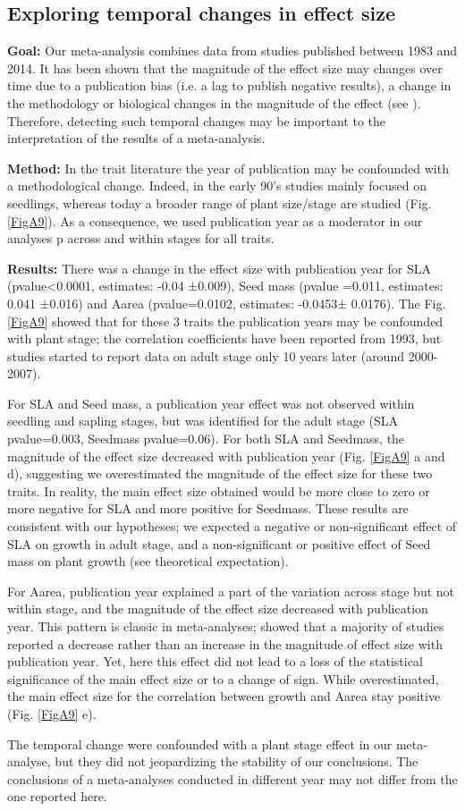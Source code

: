 \documentclass[a4paper]{article}\usepackage[]{graphicx}\usepackage[]{color}
\begin{document}
\begin{appendices}
\subsection{Exploring temporal changes in effect size}
\textbf{Goal:} Our meta-analysis combines data from studies published between 1983 and 2014. It has been shown that the magnitude of the effect size may changes over time due to a publication bias (i.e. a lag to publish negative results), a change in the methodology or biological changes in the magnitude of the effect (see \citealt{Koricheva:2013hy}). Therefore, detecting such temporal changes may be important to the interpretation of the results of a meta-analysis. 

\textbf{Method:} In the trait literature the year of publication may be confounded with a methodological change. Indeed, in the early 90’s studies mainly focused on seedlings, whereas today a broader range of plant size/stage are studied (Fig. \ref{FigA9}). As a consequence, we used publication year as a moderator in our analyses \citep{Zvereva:2008jm}p across and within stages for all traits. 
 
\textbf{Results:} There was a change in the effect size with publication year for SLA (pvalue<0.0001, estimates: -0.04 ±0.009), Seed mass (pvalue =0.011, estimates: 0.041 ±0.016) and Aarea (pvalue=0.0102, estimates: -0.0453± 0.0176). The Fig. \ref{FigA9} showed that for these 3 traits the publication years may be confounded with plant stage; the correlation coefficients have been reported from 1993, but studies started to report data on adult stage only 10 years later (around 2000-2007). 

For SLA and Seed mass, a publication year effect was not observed within seedling and sapling stages, but was identified for the adult stage (SLA pvalue=0.003, Seedmass pvalue=0.06). For both SLA and Seedmass, the magnitude of the effect size decreased with publication year (Fig. \ref{FigA9} a and d), suggesting we overestimated the magnitude of the effect size for these two traits.  In reality, the main effect size obtained would be more close to zero or more negative for SLA and more positive for Seedmass. These results are consistent with our hypotheses; we expected a negative or non-significant effect of SLA on growth in adult stage, and a non-significant or positive effect of Seed mass on plant growth (see theoretical expectation).

For Aarea, publication year explained a part of the variation across stage but not within stage, and the magnitude of the effect size decreased with publication year. This pattern is classic in meta-analyses; \citealt{Koricheva:2013hy} showed that a majority of studies reported a decrease rather than an increase in the magnitude of effect size with publication year.  Yet, here this effect did not lead to a loss of the statistical significance of the main effect size or to a change of sign. While overestimated, the main effect size for the correlation between growth and Aarea stay positive  (Fig. \ref{FigA9} e).

The temporal change were confounded with a plant stage effect in our meta-analyse, but they did not jeopardizing the stability of our conclusions. The conclusions of a meta-analyses conducted in different year may not differ from the one reported here.


\end{appendices}
\end{document}
